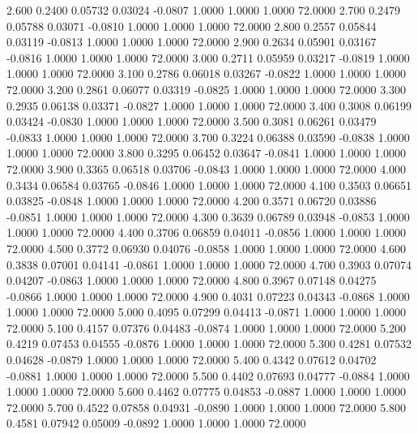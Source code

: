    2.600   0.2400   0.05732   0.03024  -0.0807   1.0000   1.0000   1.0000  72.0000
   2.700   0.2479   0.05788   0.03071  -0.0810   1.0000   1.0000   1.0000  72.0000
   2.800   0.2557   0.05844   0.03119  -0.0813   1.0000   1.0000   1.0000  72.0000
   2.900   0.2634   0.05901   0.03167  -0.0816   1.0000   1.0000   1.0000  72.0000
   3.000   0.2711   0.05959   0.03217  -0.0819   1.0000   1.0000   1.0000  72.0000
   3.100   0.2786   0.06018   0.03267  -0.0822   1.0000   1.0000   1.0000  72.0000
   3.200   0.2861   0.06077   0.03319  -0.0825   1.0000   1.0000   1.0000  72.0000
   3.300   0.2935   0.06138   0.03371  -0.0827   1.0000   1.0000   1.0000  72.0000
   3.400   0.3008   0.06199   0.03424  -0.0830   1.0000   1.0000   1.0000  72.0000
   3.500   0.3081   0.06261   0.03479  -0.0833   1.0000   1.0000   1.0000  72.0000
   3.700   0.3224   0.06388   0.03590  -0.0838   1.0000   1.0000   1.0000  72.0000
   3.800   0.3295   0.06452   0.03647  -0.0841   1.0000   1.0000   1.0000  72.0000
   3.900   0.3365   0.06518   0.03706  -0.0843   1.0000   1.0000   1.0000  72.0000
   4.000   0.3434   0.06584   0.03765  -0.0846   1.0000   1.0000   1.0000  72.0000
   4.100   0.3503   0.06651   0.03825  -0.0848   1.0000   1.0000   1.0000  72.0000
   4.200   0.3571   0.06720   0.03886  -0.0851   1.0000   1.0000   1.0000  72.0000
   4.300   0.3639   0.06789   0.03948  -0.0853   1.0000   1.0000   1.0000  72.0000
   4.400   0.3706   0.06859   0.04011  -0.0856   1.0000   1.0000   1.0000  72.0000
   4.500   0.3772   0.06930   0.04076  -0.0858   1.0000   1.0000   1.0000  72.0000
   4.600   0.3838   0.07001   0.04141  -0.0861   1.0000   1.0000   1.0000  72.0000
   4.700   0.3903   0.07074   0.04207  -0.0863   1.0000   1.0000   1.0000  72.0000
   4.800   0.3967   0.07148   0.04275  -0.0866   1.0000   1.0000   1.0000  72.0000
   4.900   0.4031   0.07223   0.04343  -0.0868   1.0000   1.0000   1.0000  72.0000
   5.000   0.4095   0.07299   0.04413  -0.0871   1.0000   1.0000   1.0000  72.0000
   5.100   0.4157   0.07376   0.04483  -0.0874   1.0000   1.0000   1.0000  72.0000
   5.200   0.4219   0.07453   0.04555  -0.0876   1.0000   1.0000   1.0000  72.0000
   5.300   0.4281   0.07532   0.04628  -0.0879   1.0000   1.0000   1.0000  72.0000
   5.400   0.4342   0.07612   0.04702  -0.0881   1.0000   1.0000   1.0000  72.0000
   5.500   0.4402   0.07693   0.04777  -0.0884   1.0000   1.0000   1.0000  72.0000
   5.600   0.4462   0.07775   0.04853  -0.0887   1.0000   1.0000   1.0000  72.0000
   5.700   0.4522   0.07858   0.04931  -0.0890   1.0000   1.0000   1.0000  72.0000
   5.800   0.4581   0.07942   0.05009  -0.0892   1.0000   1.0000   1.0000  72.0000
